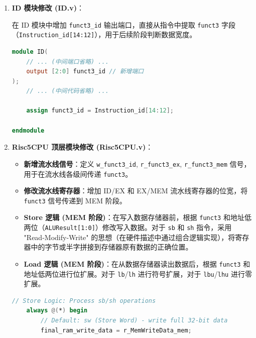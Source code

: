 \documentclass[12pt,a4paper]{article}
\begin{document}
\begin{enumerate}
    \item \textbf{ID 模块修改 (ID.v)}：
    
    在 ID 模块中增加 \texttt{funct3\_id} 输出端口，直接从指令中提取 \texttt{funct3} 字段（\texttt{Instruction\_id[14:12]}），用于后续阶段判断数据宽度。

\begin{lstlisting}[language=verilog]
module ID(
    // ... (中间端口省略) ...
    output [2:0] funct3_id // 新增端口
);
    // ... (中间代码省略) ...
    
    assign funct3_id = Instruction_id[14:12];

endmodule
\end{lstlisting}

    \item \textbf{Risc5CPU 顶层模块修改 (Risc5CPU.v)}：
    
    \begin{itemize}
        \item \textbf{新增流水线信号}：定义 \texttt{w\_funct3\_id}, \texttt{r\_funct3\_ex}, \texttt{r\_funct3\_mem} 信号，用于在流水线各级间传递 \texttt{funct3}。
        \item \textbf{修改流水线寄存器}：增加 ID/EX 和 EX/MEM 流水线寄存器的位宽，将 \texttt{funct3} 信号传递到 MEM 阶段。
        \item \textbf{Store 逻辑 (MEM 阶段)}：在写入数据存储器前，根据 \texttt{funct3} 和地址低两位（\texttt{ALUResult[1:0]}）修改写入数据。对于 \texttt{sb} 和 \texttt{sh} 指令，采用 "Read-Modify-Write" 的思想（在硬件描述中通过组合逻辑实现），将寄存器中的字节或半字拼接到存储器原有数据的正确位置。
        \item \textbf{Load 逻辑 (MEM 阶段)}：在从数据存储器读出数据后，根据 \texttt{funct3} 和地址低两位进行位扩展。对于 \texttt{lb}/\texttt{lh} 进行符号扩展，对于 \texttt{lbu}/\texttt{lhu} 进行零扩展。
    \end{itemize}

\begin{lstlisting}[language=verilog]
    // Store Logic: Process sb/sh operations
    always @(*) begin
        // Default: sw (Store Word) - write full 32-bit data
        final_ram_write_data = r_MemWriteData_mem;
        

\end{lstlisting}
\end{enumerate}
\end{document}
